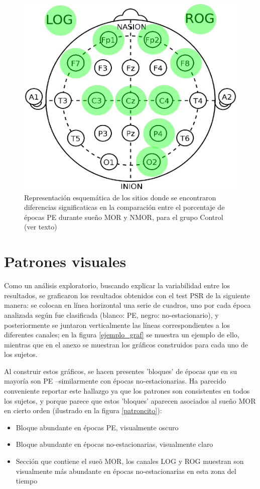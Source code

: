\documentclass[12pt,a4paper]{mitthesis}
\begin{document}
\begin{figure}
\centering
\includegraphics[width=0.4\linewidth]
{cabecita.pdf} 
\caption{Representaci\'on esquem\'atica de los sitios donde se encontraron diferencias 
significaticas en la comparaci\'on entre el porcentaje de \'epocas PE durante sue\~no MOR y NMOR,
para el grupo Control (ver texto)}
\label{cabecita}
\end{figure}

\section{Patrones visuales}

Como un an\'alisis exploratorio, buscando explicar la variabilidad entre los resultados, se 
graficaron los resultados obtenidos con el test PSR de la siguiente manera: se colocan en 
l\'inea horizontal una serie de cuadros, uno por cada \'epoca analizada seg\'un fue clasificada 
(blanco: PE, negro: no-estacionario), y posteriormente se juntaron verticalmente las l\'ineas
correspondientes a los diferentes canales; en la figura \ref{ejemplo_graf} se muestra un ejemplo de
ello, mientras que en el anexo se muestran los gr\'aficos construidos para cada uno de los sujetos. 

Al construir estos gr\'aficos, se hacen presentes 'bloques' de \'epocas que en su mayor\'ia son
PE --similarmente con \'epocas no-estacionarias. Ha parecido conveniente reportar este hallazgo
ya que los patrones son consistentes en todos los sujetos, y porque parece que estos 'bloques'
aparecen asociados al sue\~no MOR en cierto orden (ilustrado en la figura \ref{patroncito}):
\begin{itemize}
\item Bloque abundante en \'epocas PE, visualmente oscuro
\item Bloque abundante en \'epocas no-estacionarias, visualmente claro
\item Secci\'on que contiene el sue\~o MOR, los canales LOG y ROG muestran son visualmente m\'as
abundante en \'epocas no-estacionarias en esta zona del tiempo
\end{itemize}
\end{document}
